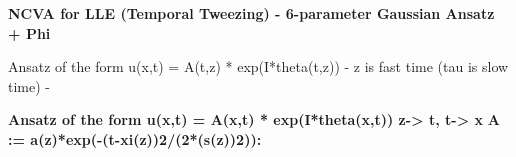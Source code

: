 %
\pagestyle{empty}
\begin{maplegroup}
\begin{center}
\begin{Maple Title}{
\textbf{NCVA for LLE (Temporal Tweezing) - 6-parameter Gaussian Ansatz + Phi}}\end{Maple Title}
\end{center}
\end{maplegroup}
\begin{Maple Normal}{
\begin{Maple Normal}{
Ansatz of the form u(x,t) = A(t,z) * exp(I*theta(t,z)) - z is fast time (tau is slow time) -}\end{Maple Normal}
}\end{Maple Normal}
\begin{maplegroup}
\begin{mapleinput}
\end{mapleinput}
\end{maplegroup}
\begin{maplegroup}
\begin{mapleinput}
\end{mapleinput}
\end{maplegroup}
\begin{maplegroup}
\textbf{Ansatz of the form u(x,t) = A(x,t) * exp(I*theta(x,t))  z-> t, t-> x}
\textbf{A := a(z)*exp(-(t-xi(z))2/(2*(s(z))2)):}\end{maplegroup}
\begin{maplegroup}
\begin{mapleinput}
\end{mapleinput}
\end{maplegroup}
